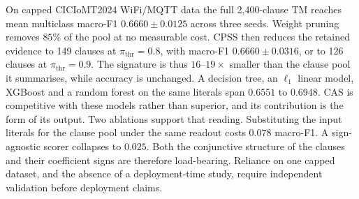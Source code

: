 \documentclass[conference]{IEEEtran}
\begin{document}
On capped CICIoMT2024 WiFi/MQTT data the full 2,400-clause TM reaches
mean multiclass macro-F1 $0.6660\pm0.0125$ across three seeds. Weight
pruning removes $85\%$ of the pool at no measurable cost. CPSS then
reduces the retained evidence to 149 clauses at
$\pi_{\mathrm{thr}}=0.8$, with macro-F1 $0.6660\pm0.0316$, or to 126
clauses at $\pi_{\mathrm{thr}}=0.9$. The signature is thus
$16$--$19\times$ smaller than the clause pool it summarises, while
accuracy is unchanged. A decision tree, an $\ell_1$ linear model,
XGBoost and a random forest on the same literals span $0.6551$ to
$0.6948$. CAS is competitive with these models rather than superior,
and its contribution is the form of its output. Two ablations support
that reading. Substituting the input literals for the clause pool under
the same readout costs $0.078$ macro-F1. A sign-agnostic scorer
collapses to $0.025$. Both the conjunctive structure of the clauses and
their coefficient signs are therefore load-bearing. Reliance on one
capped dataset, and the absence of a deployment-time study, require
independent validation before deployment claims.


\end{document}
